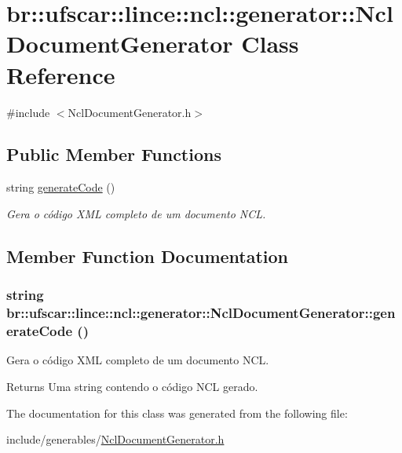 \hypertarget{classbr_1_1ufscar_1_1lince_1_1ncl_1_1generator_1_1NclDocumentGenerator}{
\section{br::ufscar::lince::ncl::generator::NclDocumentGenerator Class Reference}
\label{classbr_1_1ufscar_1_1lince_1_1ncl_1_1generator_1_1NclDocumentGenerator}
}


{\ttfamily \#include $<$NclDocumentGenerator.h$>$}

\subsection*{Public Member Functions}
\begin{DoxyCompactItemize}
\item 
string \hyperlink{classbr_1_1ufscar_1_1lince_1_1ncl_1_1generator_1_1NclDocumentGenerator_a6af0d84460aef830700821db84deb121}{generateCode} ()
\begin{DoxyCompactList}\small\item\em Gera o código XML completo de um documento NCL. \item\end{DoxyCompactList}\end{DoxyCompactItemize}


\subsection{Member Function Documentation}
\hypertarget{classbr_1_1ufscar_1_1lince_1_1ncl_1_1generator_1_1NclDocumentGenerator_a6af0d84460aef830700821db84deb121}{
\subsubsection[{generateCode}]{\setlength{\rightskip}{0pt plus 5cm}string br::ufscar::lince::ncl::generator::NclDocumentGenerator::generateCode ()}}
\label{classbr_1_1ufscar_1_1lince_1_1ncl_1_1generator_1_1NclDocumentGenerator_a6af0d84460aef830700821db84deb121}


Gera o código XML completo de um documento NCL. 

\begin{DoxyReturn}{Returns}
Uma string contendo o código NCL gerado. 
\end{DoxyReturn}


The documentation for this class was generated from the following file:\begin{DoxyCompactItemize}
\item 
include/generables/\hyperlink{NclDocumentGenerator_8h}{NclDocumentGenerator.h}\end{DoxyCompactItemize}
